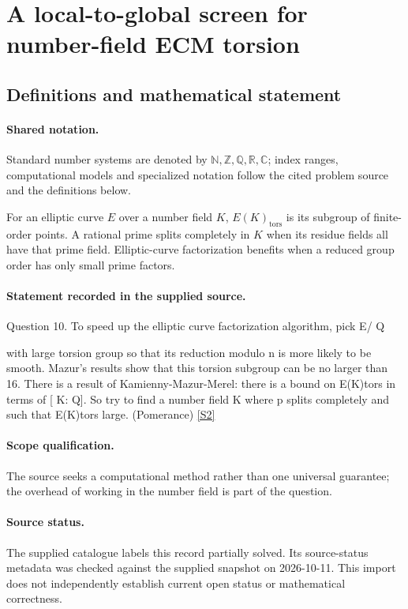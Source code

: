 \documentclass[11pt]{article}
\newcommand{\sref}[2]{\hyperlink{source:#1:#2}{[S#2]}}
\begin{document}
\section{A local-to-global screen for number-field ECM torsion}\label{statement}

\subsection{Definitions and mathematical statement}

\paragraph{Shared notation.}Standard number systems are denoted by $\mathbb N,\mathbb Z,\mathbb Q,\mathbb R,\mathbb C$; index ranges, computational models and specialized notation follow the cited problem source and the definitions below.


For an elliptic curve $E$ over a number field $K$, $E(K)_{\mathrm{tors}}$ is its subgroup of finite-order points. A rational prime splits completely in $K$ when its residue fields all have that prime field. Elliptic-curve factorization benefits when a reduced group order has only small prime factors.
\paragraph{Statement recorded in the supplied source.}
Question 10. To speed up the elliptic curve factorization algorithm, pick E/ Q

with large torsion group so that its reduction modulo n is more likely to be smooth. Mazur's results show that this torsion subgroup can be no larger than 16. There is a result of Kamienny-Mazur-Merel: there is a bound on E(K)tors in terms of [ K: Q]. So try to find a number field K where p splits completely and such that E(K)tors large. (Pomerance) \sref{statement}{2}
\paragraph{Scope qualification.}
The source seeks a computational method rather than one universal guarantee; the overhead of working in the number field is part of the question.
\paragraph{Source status.}
The supplied catalogue labels this record partially solved. Its source-status metadata was checked against the supplied snapshot on 2026-10-11. This import does not independently establish current open status or mathematical correctness.
\end{document}
